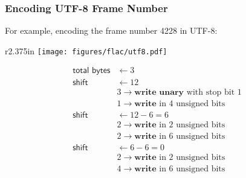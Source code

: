 \subsubsection{Encoding UTF-8 Frame Number}
\label{flac:write_utf8}
{
\EALGORITHM
}
\par
\noindent
For example, encoding the frame number 4228 in UTF-8:
\par
\noindent
\begin{wrapfigure}[10]{r}{2.375in}
\texttt{[image: figures/flac/utf8.pdf]}
\end{wrapfigure}
\begin{align*}
\textsf{total bytes} &\leftarrow 3 \\
\textsf{shift} &\leftarrow 12 \\
& 3 \rightarrow \textbf{write unary} \text{ with stop bit 1} \\
& 1 \rightarrow \textbf{write} \text{ in 4 unsigned bits} \\
\textsf{shift} &\leftarrow 12 - 6 = 6 \\
& 2 \rightarrow \textbf{write} \text{ in 2 unsigned bits} \\
& 2 \rightarrow \textbf{write} \text{ in 6 unsigned bits} \\
\textsf{shift} &\leftarrow 6 - 6 = 0 \\
& 2 \rightarrow \textbf{write} \text{ in 2 unsigned bits} \\
& 4 \rightarrow \textbf{write} \text{ in 6 unsigned bits}
\end{align*}

